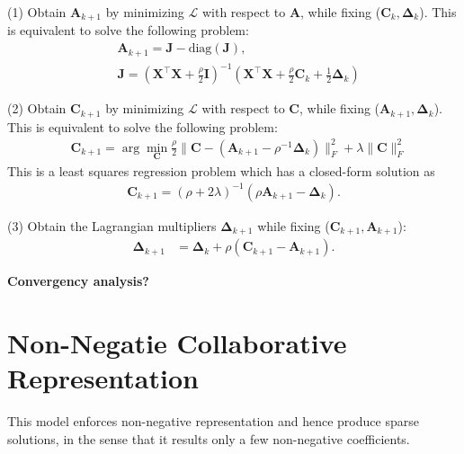 \documentclass[10pt,twocolumn,letterpaper]{article}
\begin{document}
(1) Obtain $\bm{A}_{k+1}$ by minimizing $\mathcal{L}$ with respect to $\bm{A}$, while fixing ($\bm{C}_{k},\bm{\Delta}_{k}$). This is equivalent to solve the following problem:
\begin{equation}
\begin{split}
\label{e7}
&
\bm{A}_{k+1}
=
\bm{J}-\text{diag}(\bm{J}),
\\
&
\bm{J}
=
(\bm{X}^{\top}\bm{X}+\frac{\rho}{2}\bm{I})^{-1}
(\bm{X}^{\top}\bm{X}+\frac{\rho}{2}\bm{C}_{k}+\frac{1}{2}\bm{\Delta}_{k})
\end{split}
\end{equation}

(2) Obtain $\bm{C}_{k+1}$ by minimizing $\mathcal{L}$ with respect to $\bm{C}$, while fixing ($\bm{A}_{k+1},\bm{\Delta}_{k}$). This is equivalent to solve the following problem:
\begin{equation}
\begin{split}
\label{e8}
&
\bm{C}_{k+1}
=
\arg\min_{\bm{C}}
\frac{\rho}{2}
\|
\bm{C}-(\bm{A}_{k+1}-\rho^{-1}\bm{\Delta}_{k})
\|_{F}^{2}
+
\lambda
\|
\bm{C}
\|_{F}^{2}
\end{split}
\end{equation}
This is a least squares regression problem which has a closed-form solution as 
\begin{equation}
\begin{split}
\label{e9}
\bm{C}_{k+1} 
=
(\rho+2\lambda)^{-1}(\rho\bm{A}_{k+1}-\bm{\Delta}_{k}).
\end{split}
\end{equation}

(3) Obtain the Lagrangian multipliers $\bm{\Delta}_{k+1}$ while fixing ($\bm{C}_{k+1},\bm{A}_{k+1}$):
\begin{equation}
\begin{split}
\label{e10}
\bm{\Delta}_{k+1}
&
=
\bm{\Delta}_{k}
+
\rho
(\bm{C}_{k+1}-\bm{A}_{k+1})
.
\end{split}
\end{equation}

\textbf{Convergency analysis?}

\section{Non-Negatie Collaborative Representation}

This model enforces non-negative representation and hence produce sparse solutions, in the sense that it results only a few non-negative coefficients.
\end{document}
